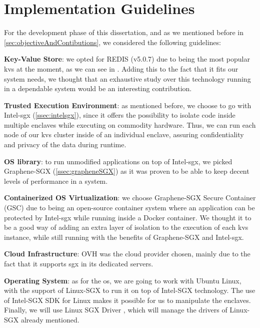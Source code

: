 \section{Implementation Guidelines} %

For the development phase of this dissertation, and as we mentioned before in \ref{sec:objectiveAndContibutions}, we considered the following guidelines:

\textbf{Key-Value Store}: we opted for REDIS (v5.0.7) due to being the most popular \gls{kvs} at the moment, as we can see in \cite{rankingKVStores}. Adding this to the fact that it fits our system needs, we thought that an exhaustive study over this technology running in a dependable system would be an interesting contribution.

\textbf{Trusted Execution Environment}: as mentioned before, we choose to go with Intel-\gls{sgx} (\ref{ssec:intelsgx}), since it offers the possibility to isolate code inside multiple enclaves while executing on commodity hardware. Thus, we can run each node of our \gls{kvs} cluster inside of an individual enclave, assuring confidentiality and privacy of the data during runtime.

\textbf{OS library}: to run unmodified applications on top of Intel-\gls{sgx}, we picked Graphene-SGX (\ref{ssec:grapheneSGX}) as it was proven to be able to keep decent levels of performance in a system.

\textbf{Containerized OS Virtualization}: we choose Graphene-SGX Secure Container (GSC) \cite{gsc} due to being an open-source container system where an application can be protected by Intel-\gls{sgx} while running inside a Docker \cite{docker} container. We thought it to be a good way of adding an extra layer of isolation to the execution of each \gls{kvs} instance, while still running with the benefits of Graphene-SGX and Intel-\gls{sgx}.

\textbf{Cloud Infrastructure}: OVH \cite{ovhCloud} was the cloud provider chosen, mainly due to the fact that it supports \gls{sgx} in its dedicated servers.

\textbf{Operating System}: as for the \gls{os}, we are going to work with Ubuntu Linux, with the support of Linux-SGX \cite{linuxSGXwebsite} to run it on top of Intel-SGX technology. The use of Intel-SGX SDK \cite{linuxSgxSDK} for Linux makes it possible for us to manipulate the enclaves. Finally, we will use Linux SGX Driver \cite{linuxSGXDrivers}, which will manage the drivers of Linux-SGX already mentioned.

